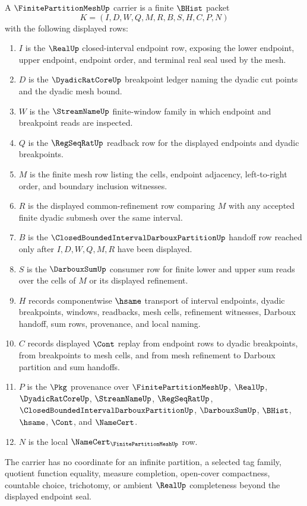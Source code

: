 \begin{definition}
\label{def:finite-partition-mesh-carrier}
A $\FinitePartitionMeshUp$ carrier is a finite $\BHist$ packet
$$
K=(I,D,W,Q,M,R,B,S,H,C,P,N)
$$
with the following displayed rows:
\begin{enumerate}
\item $I$ is the $\RealUp$ closed-interval endpoint row, exposing the lower endpoint, upper endpoint, endpoint order, and terminal real seal used by the mesh.
\item $D$ is the $\DyadicRatCoreUp$ breakpoint ledger naming the dyadic cut points and the dyadic mesh bound.
\item $W$ is the $\StreamNameUp$ finite-window family in which endpoint and breakpoint reads are inspected.
\item $Q$ is the $\RegSeqRatUp$ readback row for the displayed endpoints and dyadic breakpoints.
\item $M$ is the finite mesh row listing the cells, endpoint adjacency, left-to-right order, and boundary inclusion witnesses.
\item $R$ is the displayed common-refinement row comparing $M$ with any accepted finite dyadic submesh over the same interval.
\item $B$ is the $\ClosedBoundedIntervalDarbouxPartitionUp$ handoff row reached only after $I,D,W,Q,M,R$ have been displayed.
\item $S$ is the $\DarbouxSumUp$ consumer row for finite lower and upper sum reads over the cells of $M$ or its displayed refinement.
\item $H$ records componentwise $\hsame$ transport of interval endpoints, dyadic breakpoints, windows, readbacks, mesh cells, refinement witnesses, Darboux handoff, sum rows, provenance, and local naming.
\item $C$ records displayed $\Cont$ replay from endpoint rows to dyadic breakpoints, from breakpoints to mesh cells, and from mesh refinement to Darboux partition and sum handoffs.
\item $P$ is the $\Pkg$ provenance over $\FinitePartitionMeshUp$, $\RealUp$, $\DyadicRatCoreUp$, $\StreamNameUp$, $\RegSeqRatUp$, $\ClosedBoundedIntervalDarbouxPartitionUp$, $\DarbouxSumUp$, $\BHist$, $\hsame$, $\Cont$, and $\NameCert$.
\item $N$ is the local $\NameCert_{\FinitePartitionMeshUp}$ row.
\end{enumerate}
The carrier has no coordinate for an infinite partition, a selected tag family, quotient function equality, measure completion, open-cover compactness, countable choice, trichotomy, or ambient $\RealUp$ completeness beyond the displayed endpoint seal.
\end{definition}

